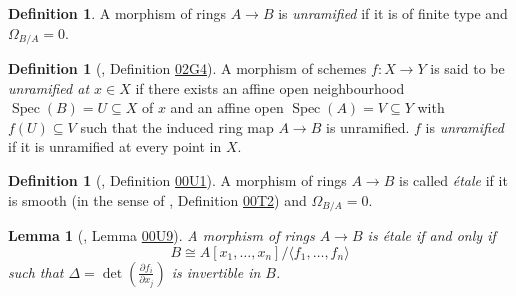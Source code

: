 \documentclass{article}
\numberwithin{equation}{section}
\numberwithin{figure}{section}
\newcommand{\Spec}{\mathop{\mathrm{Spec}}}
\theoremstyle{plain}
\newtheorem{lem}[thm]{Lemma}
\theoremstyle{definition}
\newtheorem{defn}[thm]{Definition}
\theoremstyle{remark}
\begin{document}
\begin{defn}
    A morphism of rings $A \to B$ is \emph{unramified} if it is of finite type and $\Omega_{B/A} = 0$. 
\end{defn}
\begin{defn}[\cite{stacks}, Definition \href{https://stacks.math.columbia.edu/tag/02G4}{02G4}]
 A morphism of schemes $f: X \to Y$ is said to be \emph{unramified at $x \in X$} if there exists an affine open neighbourhood $\Spec(B) = U \subseteq X$ of $x$ and an affine open $\Spec(A) = V \subseteq Y$ with $f(U) \subseteq V$ such that the induced ring map $A \to B$ is unramified. $f$ is \emph{unramified} if it is unramified at every point in $X$.
\end{defn}

\begin{defn}[\cite{stacks}, Definition \href{https://stacks.math.columbia.edu/tag/00U1}{00U1}]
    A morphism of rings $A \to B$ is called \emph{\'etale} if it is smooth (in the sense of \cite{stacks}, Definition \href{https://stacks.math.columbia.edu/tag/00T2}{00T2}) and $\Omega_{B/A} = 0$.
\end{defn}

\begin{lem}[\cite{stacks}, Lemma \href{https://stacks.math.columbia.edu/tag/00U9}{00U9}]
    A morphism of rings $A \to B$ is \'etale if and only if 
    \[B \cong A[x_1, \hdots, x_n]/\langle f_1, \hdots, f_n \rangle\]
    such that $\Delta = \det\left(\frac{\partial f_i}{\partial x_j}\right)$ is invertible in $B$.
\end{lem}
\end{document}
